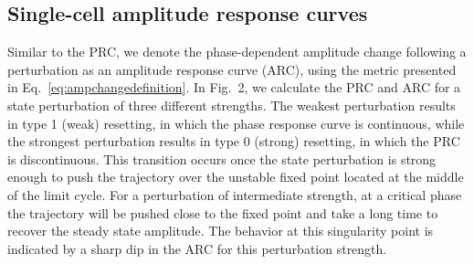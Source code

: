 \documentclass[11pt, letterpaper]{article}
\providecommand{\DIFadd}[1]{{\protect\color{blue}#1}} %
\providecommand{\DIFdel}[1]{{\protect\color{red}}}                      %
\providecommand{\DIFaddbegin}{} %
\providecommand{\DIFaddend}{} %
\providecommand{\DIFdelbegin}{} %
\providecommand{\DIFdelend}{} %
\begin{document}
\DIFaddend \subsection*{\DIFdelbegin \DIFdel{Amplitude }\DIFdelend \DIFaddbegin \DIFadd{Single-cell amplitude }\DIFaddend response curves}
Similar to the \DIFdelbegin \DIFdel{phase response curve (PRC)}\DIFdelend \DIFaddbegin \DIFadd{PRC}\DIFaddend , we denote the phase-dependent amplitude change following a perturbation as an amplitude response curve (ARC), using the metric presented in Eq.~\ref{eq:ampchangedefinition}.
In Fig.\DIFaddbegin \DIFadd{~}\DIFaddend 2, we calculate the PRC and ARC for a state perturbation of \DIFdelbegin \DIFdel{3 }\DIFdelend \DIFaddbegin \DIFadd{three }\DIFaddend different strengths.
The weakest perturbation results in type 1 (weak) resetting, in which the phase response curve is continuous, while the strongest perturbation results in type 0 (strong) resetting, in which the \DIFdelbegin \DIFdel{phase response curve }\DIFdelend \DIFaddbegin \DIFadd{PRC }\DIFaddend is discontinuous.
This transition occurs once the state perturbation is strong enough to push the trajectory over the unstable fixed point located at the middle of the limit cycle.
For a perturbation of intermediate strength, at a critical phase the trajectory will be pushed close to the fixed point and take a long time to recover the steady state amplitude.
\DIFdelbegin \DIFdel{This }\DIFdelend \DIFaddbegin \DIFadd{The behavior at this }\DIFaddend singularity point is indicated by a sharp dip in the ARC for this perturbation strength.
\end{document}
